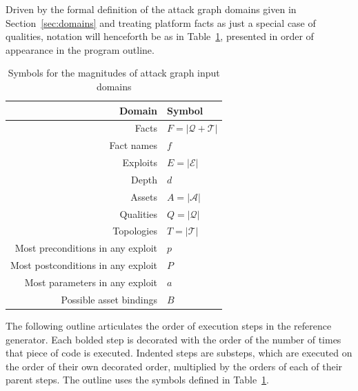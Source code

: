 Driven by the formal definition of the attack graph domains given in 
Section~\ref{sec:domains} and treating platform facts as just a special case
of qualities, notation will henceforth be as in Table~\ref{table:onotation},
presented in order of appearance in the program outline.

\begin{table}
\centering
\begin{tabular}{r|l}
Domain & Symbol \\ \hline
Facts       & $F = |\mathcal{Q}+\mathcal{T}|$ \\
Fact names  & $f$ \\
Exploits    & $E = |\mathcal{E}|$ \\
Depth       & $d$ \\
Assets      & $A = |\mathcal{A}|$ \\
Qualities   & $Q = |\mathcal{Q}|$ \\
Topologies  & $T = |\mathcal{T}|$ \\
Most preconditions in any exploit & $p$ \\
Most postconditions in any exploit & $P$ \\
Most parameters in any exploit & $a$ \\
Possible asset bindings & $B$ \\
\end{tabular}
\caption{Symbols for the magnitudes of attack graph input domains}
\label{table:onotation}
\end{table}

The following outline articulates the order of execution steps in the reference
generator. Each bolded step is decorated with the order of the number of
times that piece of code is executed. Indented steps are substeps, which are
executed on the order of their own decorated order, multiplied by the orders of
each of their parent steps. The outline uses the symbols defined in 
Table~\ref{table:onotation}.

